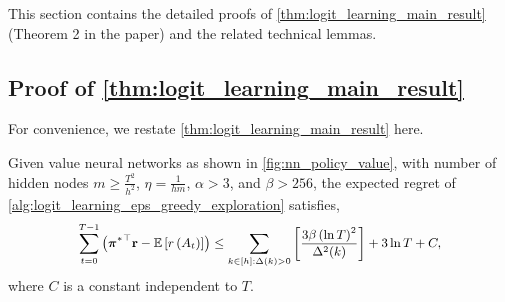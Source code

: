 This section contains the detailed proofs of \cref{thm:logit_learning_main_result} (Theorem 2 in the paper) and the related technical lemmas.

\subsection{Proof of \cref{thm:logit_learning_main_result}}

For convenience, we restate \cref{thm:logit_learning_main_result} here.

\begin{thm}
\label{thm:logit_learning_main_result}
    Given value neural networks as shown in \cref{fig:nn_policy_value}, with number of hidden nodes $m \ge \frac{T^2}{h^2}$, $\eta = \frac{1}{h m}$,  $\alpha > 3$, and $\beta > 256$, the expected regret of \cref{alg:logit_learning_eps_greedy_exploration} satisfies,
\begin{equation*}
\small
\begin{split}
    \sum\limits_{t=0}^{T-1}{ \left( {\rvpi^*}^\top \rvr - \sE \left[ r\left(A_t\right) \right] \right)} \le \sum\limits_{k \in [h] : \Delta(k) > 0}{ \left[ \frac{ 3 \beta \left( \ln{T} \right)^2}{\Delta^2(k)} \right] }  + 3 \ln{T} + C,
\end{split}
\end{equation*}
where $C$ is a constant independent to $T$.
\end{thm}
